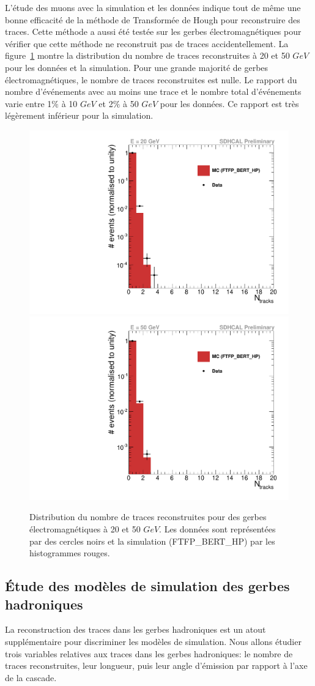 L'étude des muons avec la simulation et les données indique tout de même une bonne efficacité de la méthode de Transformée de Hough pour reconstruire des traces. Cette méthode a aussi été testée sur les gerbes électromagnétiques pour vérifier que cette méthode ne reconstruit pas de traces accidentellement. La figure~\ref{fig.e-_ntrack} montre la distribution du nombre de traces reconstruites à 20 et 50 $GeV$ pour les données et la simulation. Pour une grande majorité de gerbes électromagnétiques, le nombre de traces reconstruites est nulle. Le rapport du nombre d'événements avec au moins une trace et le nombre total d'événements varie entre 1$\%$ à 10 $GeV$ et 2$\%$ à 50 $GeV$ pour les données. Ce rapport est très légèrement inférieur pour la simulation.
\begin{figure}[!ht]
  \centering
  \includegraphics[width=.45\textwidth]{Shower/figs/ntrack_electron_20GeV_AugSep2012.pdf}
  \includegraphics[width=.45\textwidth]{Shower/figs/ntrack_electron_50GeV_AugSep2012.pdf}
  \caption{Distribution du nombre de traces reconstruites pour des gerbes électromagnétiques à 20 et 50 $GeV$. Les données sont représentées par des cercles noirs et la simulation (FTFP\_BERT\_HP) par les histogrammes rouges. \label{fig.e-_ntrack}}
\end{figure}

\subsection{Étude des modèles de simulation des gerbes hadroniques}
La reconstruction des traces dans les gerbes hadroniques est un atout supplémentaire pour discriminer les modèles de simulation. Nous allons étudier trois variables relatives aux traces dans les gerbes hadroniques: le nombre de traces reconstruites, leur longueur, puis leur angle d'émission par rapport à l'axe de la cascade.
